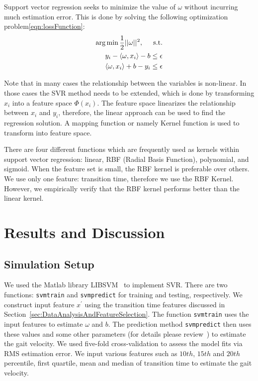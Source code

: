 \documentclass[journal]{IEEEtran}
\begin{document}
Support vector regression seeks to minimize the value of $\omega$ without incurring much estimation error. This is done by solving the following optimization problem\eqref{eqn:lossFunction}:
\begin{eqnarray}
\arg\min \frac{1}{2}||\omega||^2, \hspace{0.5cm} \mbox{s.t.} \label{eqn:lossFunction}\\  
y_i - \langle \omega, x_i\rangle - b \leq \epsilon\nonumber\\
\langle \omega, x_i\rangle + b - y_i  \leq \epsilon\nonumber
\end{eqnarray}


Note that in many cases the relationship between the variables is non-linear. 
In those cases the SVR method needs to be extended, which is done by transforming $x_i$ into a feature space $\Phi(x_i)$. The feature space linearizes  
the  relationship between $x_i$ and $y_i$, therefore, the linear approach can be used to find the regression solution. A mapping function or namely Kernel function is used to transform into feature space. 

There are four different functions which are frequently used as kernels within support vector regression: linear, RBF (Radial Basis Function), polynomial, and sigmoid. When the feature set is small, the RBF kernel is preferable over others. We use only one feature: transition time, therefore we use the RBF Kernel. However, we empirically verify that the RBF kernel performs better than the linear kernel. 







\section{Results and Discussion}
\subsection{Simulation Setup}
We used the Matlab library LIBSVM~\cite{chang2011libsvm} to implement SVR. There are two functions: \texttt{svmtrain} and \texttt{svmpredict} for training and testing, respectively. We construct input feature $x^{'}$ using the transition time features discussed in Section~\ref{sec:DataAnalysisAndFeatureSelection}. The function \texttt{svmtrain} uses the input features to estimate $\omega$ and $b$. The prediction method \texttt{svmpredict} then uses these values and some other parameters (for details please review~\cite{chang2011libsvm}) to estimate the gait velocity. We used five-fold cross-validation to assess the model fits via RMS estimation error.  We input various features such as $10th$, $15th$ and $20th$ percentile, first quartile, mean and median of transition time to estimate the gait velocity.
\end{document}
